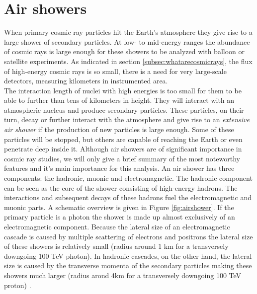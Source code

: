 \section{Air showers}
\label{sec:airshowers}
When primary cosmic ray particles hit the Earth's atmosphere they give rise to a large shower of secondary particles. At low- to mid-energy ranges the abundance of cosmic rays is large enough for these showers to be analyzed with balloon or satellite experiments. As indicated in section \ref{subsec:whatarecosmicrays}, the flux of high-energy cosmic rays is so small, there is a need for very large-scale detectors, measuring kilometers in instrumented area.\\
\newline
The interaction length of nuclei with high energies is too small for them to be able to further than tens of kilometers in height. They will interact with an atmospheric nucleus and produce secondary particles. These particles, on their turn, decay or further interact with the atmosphere and give rise to an \textit{extensive air shower} if the production of new particles is large enough. Some of these particles will be stopped, but others are capable of reaching the Earth or even penetrate deep inside it. Although air showers are of significant importance in cosmic ray studies, we will only give a brief summary of the most noteworthy features and it's main importance for this analysis.
An air shower has three components: the hadronic, muonic and electromagnetic. The hadronic component can be seen as the core of the shower consisting of high-energy hadrons. The interactions and subsequent decays of these hadrons fuel the electromagnetic and muonic parts. A schematic overview is given in Figure \ref{fig:airshower}. If the primary particle is a photon the shower is made up almost exclusively of an electromagnetic component. Because the lateral size of an electromagnetic cascade is caused by multiple scattering of electrons and positrons the lateral size of these showers is relatively small (radius around 1 km for a transversely downgoing 100 TeV photon). In hadronic cascades, on the other hand, the lateral size is caused by the transverse momenta of the secondary particles making these showers much larger (radius arond 4km for a transversely downgoing 100 TeV proton) \cite{Grupen:2005rx}.

